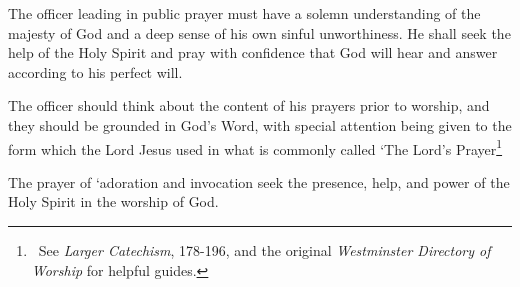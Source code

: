\begin{outerlst}[left=0pt,labelsep=0pt]
\begin{innerlst}[resume*]
      \item The officer leading in public prayer must have a solemn understanding of the majesty of God and a deep sense of his own sinful unworthiness. He shall seek the help of the Holy Spirit and pray with confidence that God will hear and answer according to his perfect will.
      \item The officer should think about the content of his prayers prior to worship, and they should be grounded in God's Word, with special attention being given to the form which the Lord Jesus used in what is commonly called `The Lord's Prayer\footnote{\ See \textit{Larger Catechism}, 178-196, and the original \textit{Westminster Directory of Worship} for helpful guides.}
      \item The prayer of `adoration and invocation seek the presence, help, and power of the Holy Spirit in the worship of God.

\end{innerlst}
\end{outerlst}
